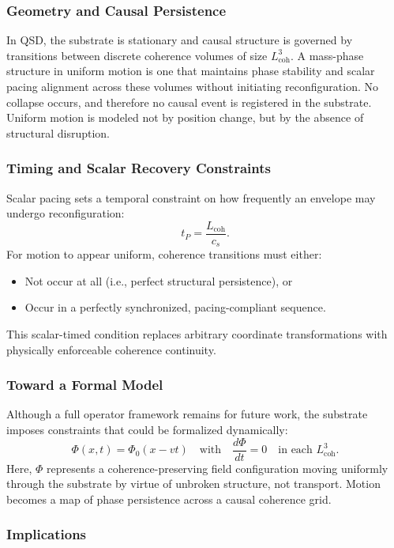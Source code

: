 \documentclass[entropy,article,submit,pdftex,oneauthor]{Definitions/mdpi}
\begin{document}
\subsubsection{Geometry and Causal Persistence}

In QSD, the substrate is stationary and causal structure is governed by transitions between discrete coherence volumes of size \texorpdfstring{\( L_{\text{coh}}^3 \)}{Lcoh\^{}3}. A mass-phase structure in uniform motion is one that maintains phase stability and scalar pacing alignment across these volumes without initiating reconfiguration. No collapse occurs, and therefore no causal event is registered in the substrate. Uniform motion is modeled not by position change, but by the absence of structural disruption.

\subsubsection{Timing and Scalar Recovery Constraints}

Scalar pacing sets a temporal constraint on how frequently an envelope may undergo reconfiguration:
\[
t_P = \frac{L_{\text{coh}}}{c_s}.
\]
For motion to appear uniform, coherence transitions must either:
\begin{itemize}
    \item Not occur at all (i.e., perfect structural persistence), or
    \item Occur in a perfectly synchronized, pacing-compliant sequence.
\end{itemize}
This scalar-timed condition replaces arbitrary coordinate transformations with physically enforceable coherence continuity.

\subsubsection{Toward a Formal Model}

Although a full operator framework remains for future work, the substrate imposes constraints that could be formalized dynamically:
\[
\Phi(x,t) = \Phi_0(x - v t) \quad \text{with} \quad \frac{d\Phi}{dt} = 0 \quad \text{in each } L_{\text{coh}}^3.
\]
Here, \texorpdfstring{\( \Phi \)}{Phi} represents a coherence-preserving field configuration moving uniformly through the substrate by virtue of unbroken structure, not transport. Motion becomes a map of phase persistence across a causal coherence grid.

\subsubsection{Implications}
\end{document}
